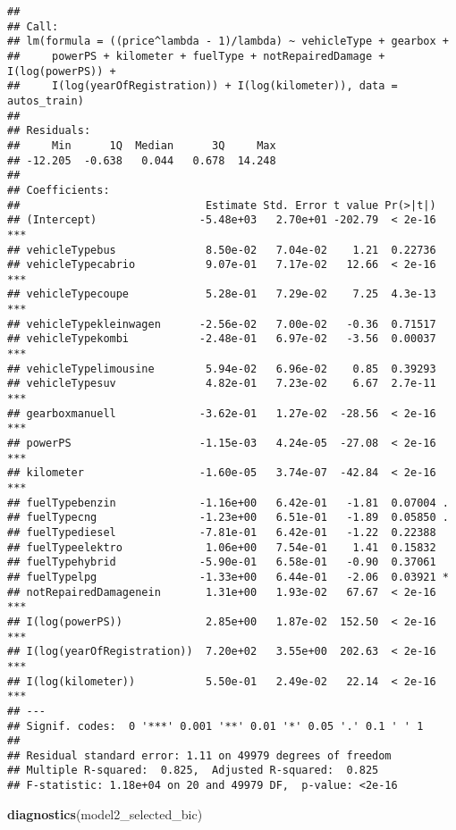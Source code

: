 \documentclass[]{article}
\newenvironment{Shaded}{\begin{snugshade}}{\end{snugshade}}
\newcommand{\KeywordTok}[1]{\textcolor[rgb]{0.13,0.29,0.53}{\textbf{#1}}}
\newcommand{\NormalTok}[1]{#1}
\begin{document}
\begin{verbatim}
## 
## Call:
## lm(formula = ((price^lambda - 1)/lambda) ~ vehicleType + gearbox + 
##     powerPS + kilometer + fuelType + notRepairedDamage + I(log(powerPS)) + 
##     I(log(yearOfRegistration)) + I(log(kilometer)), data = autos_train)
## 
## Residuals:
##     Min      1Q  Median      3Q     Max 
## -12.205  -0.638   0.044   0.678  14.248 
## 
## Coefficients:
##                             Estimate Std. Error t value Pr(>|t|)    
## (Intercept)                -5.48e+03   2.70e+01 -202.79  < 2e-16 ***
## vehicleTypebus              8.50e-02   7.04e-02    1.21  0.22736    
## vehicleTypecabrio           9.07e-01   7.17e-02   12.66  < 2e-16 ***
## vehicleTypecoupe            5.28e-01   7.29e-02    7.25  4.3e-13 ***
## vehicleTypekleinwagen      -2.56e-02   7.00e-02   -0.36  0.71517    
## vehicleTypekombi           -2.48e-01   6.97e-02   -3.56  0.00037 ***
## vehicleTypelimousine        5.94e-02   6.96e-02    0.85  0.39293    
## vehicleTypesuv              4.82e-01   7.23e-02    6.67  2.7e-11 ***
## gearboxmanuell             -3.62e-01   1.27e-02  -28.56  < 2e-16 ***
## powerPS                    -1.15e-03   4.24e-05  -27.08  < 2e-16 ***
## kilometer                  -1.60e-05   3.74e-07  -42.84  < 2e-16 ***
## fuelTypebenzin             -1.16e+00   6.42e-01   -1.81  0.07004 .  
## fuelTypecng                -1.23e+00   6.51e-01   -1.89  0.05850 .  
## fuelTypediesel             -7.81e-01   6.42e-01   -1.22  0.22388    
## fuelTypeelektro             1.06e+00   7.54e-01    1.41  0.15832    
## fuelTypehybrid             -5.90e-01   6.58e-01   -0.90  0.37061    
## fuelTypelpg                -1.33e+00   6.44e-01   -2.06  0.03921 *  
## notRepairedDamagenein       1.31e+00   1.93e-02   67.67  < 2e-16 ***
## I(log(powerPS))             2.85e+00   1.87e-02  152.50  < 2e-16 ***
## I(log(yearOfRegistration))  7.20e+02   3.55e+00  202.63  < 2e-16 ***
## I(log(kilometer))           5.50e-01   2.49e-02   22.14  < 2e-16 ***
## ---
## Signif. codes:  0 '***' 0.001 '**' 0.01 '*' 0.05 '.' 0.1 ' ' 1
## 
## Residual standard error: 1.11 on 49979 degrees of freedom
## Multiple R-squared:  0.825,  Adjusted R-squared:  0.825 
## F-statistic: 1.18e+04 on 20 and 49979 DF,  p-value: <2e-16
\end{verbatim}

\begin{Shaded}
\begin{Highlighting}[]
\KeywordTok{diagnostics}\NormalTok{(model2_selected_bic)}
\end{Highlighting}
\end{Shaded}
\end{document}

